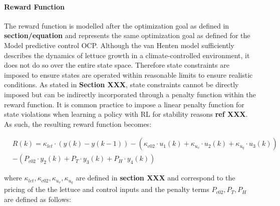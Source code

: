 \paragraph{Reward Function}
\label{paragraph:reward-function}
The reward function is modelled after the optimization goal as defined in \textbf{section/equation} and represents the same optimization goal as defined for the Model predictive control OCP. Although the van Henten model sufficiently describes the dynamics of lettuce growth in a climate-controlled environment, it does not do so over the entire state space. Therefore state constraints are imposed to ensure states are operated within reasonable limits to ensure realistic conditions. As stated in \textbf{Section XXX}, state constraints cannot be directly imposed but can be indirectly incorporated through a penalty function within the reward function. It is common practice to impose a linear penalty function for state violations when learning a policy with RL for stability reasons \textbf{ref XXX}. As such, the resulting reward function becomes:

\begin{equation}\label{eq:reward_fn}
    \begin{aligned}
        & R(k)  = \kappa_{let} \cdot (y(k)- y(k-1)) - (\kappa_{c02} \cdot u_1(k) + \kappa_{u_v} \cdot u_2(k) + \kappa_{u_q} \cdot u_3(k))  \\ 
        & - (P_{c02} \cdot y_2(k) + P_T \cdot y_3(k) + P_H \cdot y_4(k))
    \end{aligned}
\end{equation}

where $\kappa_{let},\kappa_{c02},\kappa_{u_v},\kappa_{u_q}$ are defined in \textbf{section XXX} and correspond to the pricing of the the lettuce and control inputs
and the penalty terms $P_{c02},P_T,P_H$ are defined as follows:

